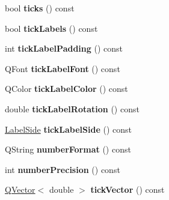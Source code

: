 \begin{DoxyCompactItemize}
\item 
bool {\bfseries ticks} () const \hypertarget{class_q_c_p_axis_a61c504ec7c5bed9a63edf45345995d10}{}\label{class_q_c_p_axis_a61c504ec7c5bed9a63edf45345995d10}

\item 
bool {\bfseries tick\+Labels} () const \hypertarget{class_q_c_p_axis_a9a78fcccd98a73d37b3d991df7b6ef1d}{}\label{class_q_c_p_axis_a9a78fcccd98a73d37b3d991df7b6ef1d}

\item 
int {\bfseries tick\+Label\+Padding} () const \hypertarget{class_q_c_p_axis_af7bc2fac3f95949ecd0204d20dc1463b}{}\label{class_q_c_p_axis_af7bc2fac3f95949ecd0204d20dc1463b}

\item 
Q\+Font {\bfseries tick\+Label\+Font} () const \hypertarget{class_q_c_p_axis_af6d7ad17f3398b114a413f7a3dc5ef9d}{}\label{class_q_c_p_axis_af6d7ad17f3398b114a413f7a3dc5ef9d}

\item 
Q\+Color {\bfseries tick\+Label\+Color} () const \hypertarget{class_q_c_p_axis_ac86d0636aa55ddd94df171f609897a32}{}\label{class_q_c_p_axis_ac86d0636aa55ddd94df171f609897a32}

\item 
double {\bfseries tick\+Label\+Rotation} () const \hypertarget{class_q_c_p_axis_ab9199d72b8c4c06cc6c9b928c30d00d2}{}\label{class_q_c_p_axis_ab9199d72b8c4c06cc6c9b928c30d00d2}

\item 
\hyperlink{class_q_c_p_axis_a24b13374b9b8f75f47eed2ea78c37db9}{Label\+Side} {\bfseries tick\+Label\+Side} () const \hypertarget{class_q_c_p_axis_a5368d75cb586241b0d4c3e3a872ed52c}{}\label{class_q_c_p_axis_a5368d75cb586241b0d4c3e3a872ed52c}

\item 
Q\+String {\bfseries number\+Format} () const \hypertarget{class_q_c_p_axis_ae6729b40845b29ffa5a440aa53cec215}{}\label{class_q_c_p_axis_ae6729b40845b29ffa5a440aa53cec215}

\item 
int {\bfseries number\+Precision} () const \hypertarget{class_q_c_p_axis_a91cb2825060ac79a889296377fe0c7c1}{}\label{class_q_c_p_axis_a91cb2825060ac79a889296377fe0c7c1}

\item 
\hyperlink{class_q_vector}{Q\+Vector}$<$ double $>$ {\bfseries tick\+Vector} () const \hypertarget{class_q_c_p_axis_a5b00b14f480f926df976cc6c52309e78}{}\label{class_q_c_p_axis_a5b00b14f480f926df976cc6c52309e78}


\end{DoxyCompactItemize}
